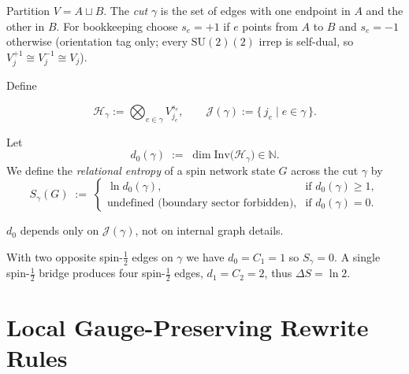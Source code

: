 \documentclass[11pt]{article}
\newcommand{\SU}{\mathrm{SU}(2)}
\newcommand{\Hil}{\mathcal{H}}
\newcommand{\Inv}{\mathrm{Inv}}
\newcommand{\Cut}{\gamma}
\newcommand{\JS}{\mathcal{J}} %
\begin{document}
\begin{definition}\label{def:cut} Partition $V=A\sqcup B$. The \emph{cut} $\Cut$ is the set of edges with one endpoint in $A$ and the other in $B$. For bookkeeping choose $s_e=+1$ if $e$ points from $A$ to $B$ and $s_e=-1$ otherwise (orientation tag only; every $\SU(2)$ irrep is self-dual, so $V_j^{+1}\!\cong V_j^{-1}\!\cong V_j$).

Define

\[\Hil_{\Cut}:=\bigotimes_{e\in\Cut} V_{j_e}^{s_e},\qquad \JS(\Cut):=\{\,j_e\mid e\in\Cut\,\}.\]

\end{definition}

\begin{definition}\label{def:entropy}
Let
\[
  d_0(\Cut)\;:=\;
  \dim\Inv\!\bigl(\Hil_{\Cut}\bigr)
  \in\mathbb{N}.
\]
We define the \emph{relational entropy} of a spin network state
\(G\) across the cut \(\Cut\) by
\[
  S_{\Cut}(G)\;:=\;
  \begin{cases}
    \ln d_0(\Cut), & \text{if } d_0(\Cut)\ge 1, \\[6pt]
    \text{undefined (boundary sector forbidden),} & \text{if } d_0(\Cut)=0.
  \end{cases}
\]
\end{definition}

\begin{remark} $d_0$ depends only on $\JS(\Cut)$, not on internal graph details. \end{remark}

\begin{example}\label{ex:toy} With two opposite spin-$\tfrac12$ edges on $\Cut$ we have $d_0=C_1=1$ so $S_{\Cut}=0$. A single spin-$\tfrac12$ bridge produces four spin-$\tfrac12$ edges, $d_1=C_2=2$, thus $\Delta S=\ln2$. \end{example}


\section{Local Gauge-Preserving Rewrite Rules}\label{sec:rewrites}
\end{document}
